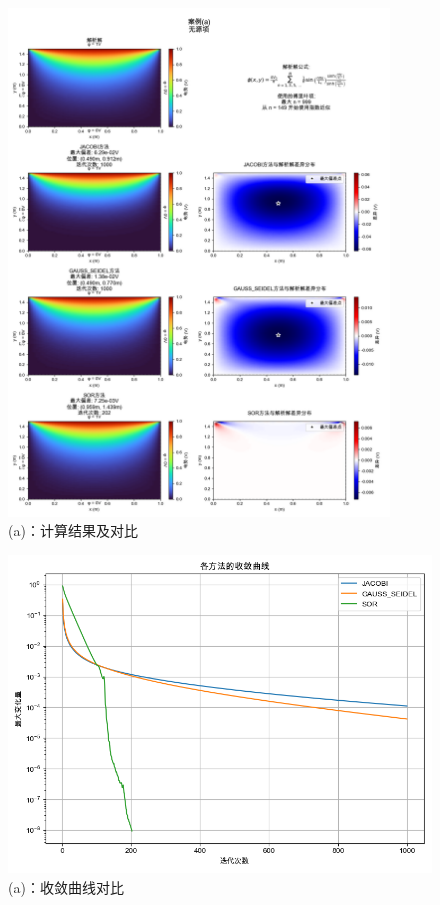 \begin{figure}[H]
    \centering
    \includegraphics[width=0.9\textwidth]{Problem_1/figs/a_result.png}
    \caption{(a)：计算结果及对比}
\end{figure}

\begin{figure}[H]
    \centering
    \includegraphics[width=1.0\textwidth]{Problem_1/figs/a_convergence.png}
    \caption{(a)：收敛曲线对比}
\end{figure}

